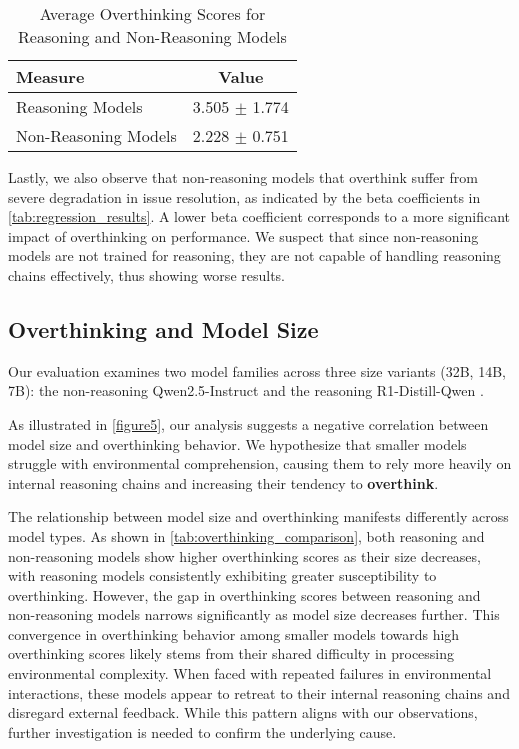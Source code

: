 \begin{table}[ht]
\centering
\begin{tabular}{lc}
\toprule
\textbf{Measure} & \textbf{Value} \\
\midrule
Reasoning Models       & 3.505 $\pm$ 1.774 \\
Non-Reasoning Models   & 2.228 $\pm$ 0.751 \\
\bottomrule
\end{tabular}
\caption{Average Overthinking Scores for Reasoning and Non-Reasoning Models}
\label{tab:overthinking_scores}
\end{table}

Lastly, we also observe that non-reasoning models
that overthink suffer from severe degradation in issue
resolution, as indicated by the beta coefficients in \cref{tab:regression_results}. A lower beta coefficient corresponds to a more significant impact of overthinking on performance. We suspect that since non-reasoning models are not trained for reasoning, they are not capable of handling reasoning chains effectively, thus showing worse results.




\subsection{Overthinking and Model Size}
Our evaluation examines two model families across three size variants (32B, 14B, 7B): the non-reasoning Qwen2.5-Instruct and the reasoning R1-Distill-Qwen \cite{qwen2,qwen2.5,deepseekai2025deepseekr1incentivizingreasoningcapability}.

As illustrated in \cref{figure5}, our analysis suggests a negative correlation between model size and overthinking behavior. We hypothesize that smaller models struggle with environmental comprehension, causing them to rely more heavily on internal reasoning chains and increasing their tendency to \textbf{overthink}.

The relationship between model size and overthinking manifests differently across model types. As shown in \cref{tab:overthinking_comparison}, both reasoning and non-reasoning models show higher overthinking scores as their size decreases, with reasoning models consistently exhibiting greater susceptibility to overthinking. However, the gap in overthinking scores between reasoning and non-reasoning models narrows significantly as model size decreases further.
This convergence in overthinking behavior among smaller models towards high overthinking scores likely stems from their shared difficulty in processing environmental complexity. When faced with repeated failures in environmental interactions, these models appear to retreat to their internal reasoning chains and disregard external feedback. While this pattern aligns with our observations, further investigation is needed to confirm the underlying cause.

